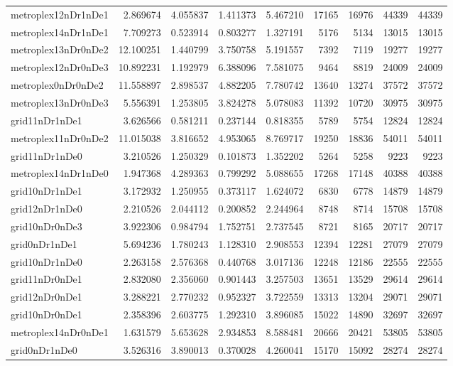 \begin{longtable}{|l|r|r|r|r|r|r|r|r|}
metroplex12nDr1nDe1 & 2.869674 & 4.055837 & 1.411373 & 5.467210 & 17165 & 16976 & 44339 & 44339 \\
metroplex14nDr1nDe1 & 7.709273 & 0.523914 & 0.803277 & 1.327191 & 5176 & 5134 & 13015 & 13015 \\
metroplex13nDr0nDe2 & 12.100251 & 1.440799 & 3.750758 & 5.191557 & 7392 & 7119 & 19277 & 19277 \\
metroplex12nDr0nDe3 & 10.892231 & 1.192979 & 6.388096 & 7.581075 & 9464 & 8819 & 24009 & 24009 \\
metroplex0nDr0nDe2 & 11.558897 & 2.898537 & 4.882205 & 7.780742 & 13640 & 13274 & 37572 & 37572 \\
metroplex13nDr0nDe3 & 5.556391 & 1.253805 & 3.824278 & 5.078083 & 11392 & 10720 & 30975 & 30975 \\
grid11nDr1nDe1 & 3.626566 & 0.581211 & 0.237144 & 0.818355 & 5789 & 5754 & 12824 & 12824 \\
metroplex11nDr0nDe2 & 11.015038 & 3.816652 & 4.953065 & 8.769717 & 19250 & 18836 & 54011 & 54011 \\
grid11nDr1nDe0 & 3.210526 & 1.250329 & 0.101873 & 1.352202 & 5264 & 5258 & 9223 & 9223 \\
metroplex14nDr1nDe0 & 1.947368 & 4.289363 & 0.799292 & 5.088655 & 17268 & 17148 & 40388 & 40388 \\
grid10nDr1nDe1 & 3.172932 & 1.250955 & 0.373117 & 1.624072 & 6830 & 6778 & 14879 & 14879 \\
grid12nDr1nDe0 & 2.210526 & 2.044112 & 0.200852 & 2.244964 & 8748 & 8714 & 15708 & 15708 \\
grid10nDr0nDe3 & 3.922306 & 0.984794 & 1.752751 & 2.737545 & 8721 & 8165 & 20717 & 20717 \\
grid0nDr1nDe1 & 5.694236 & 1.780243 & 1.128310 & 2.908553 & 12394 & 12281 & 27079 & 27079 \\
grid10nDr1nDe0 & 2.263158 & 2.576368 & 0.440768 & 3.017136 & 12248 & 12186 & 22555 & 22555 \\
grid11nDr0nDe1 & 2.832080 & 2.356060 & 0.901443 & 3.257503 & 13651 & 13529 & 29614 & 29614 \\
grid12nDr0nDe1 & 3.288221 & 2.770232 & 0.952327 & 3.722559 & 13313 & 13204 & 29071 & 29071 \\
grid10nDr0nDe1 & 2.358396 & 2.603775 & 1.292310 & 3.896085 & 15022 & 14890 & 32697 & 32697 \\
metroplex14nDr0nDe1 & 1.631579 & 5.653628 & 2.934853 & 8.588481 & 20666 & 20421 & 53805 & 53805 \\
grid0nDr1nDe0 & 3.526316 & 3.890013 & 0.370028 & 4.260041 & 15170 & 15092 & 28274 & 28274 \\

\end{longtable}
